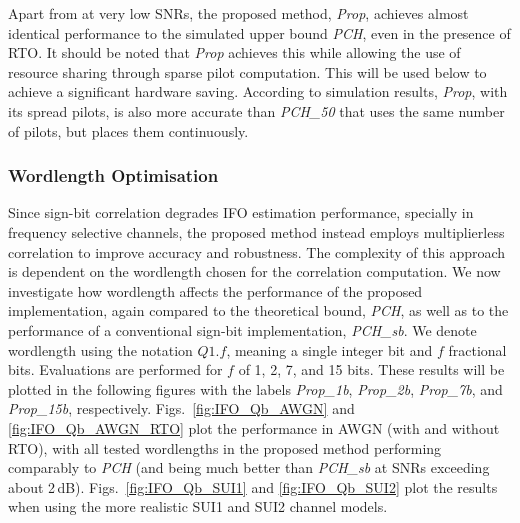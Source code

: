Apart from at very low SNRs, the proposed method, \emph{Prop}, achieves almost identical performance to the simulated upper bound \emph{PCH}, even in the presence of RTO.
It should be noted that \emph{Prop} achieves this while allowing the use of resource sharing through sparse pilot computation. This will be used below to achieve a significant hardware saving.
According to simulation results, \emph{Prop}, with its spread pilots, is also more accurate than \emph{PCH\_50} that uses the same number of pilots, but places them continuously.

\subsubsection{Wordlength Optimisation}
Since sign-bit correlation degrades IFO estimation performance, specially in frequency selective channels, the proposed method instead employs multiplierless correlation to improve accuracy and robustness.
The complexity of this approach is dependent on the wordlength chosen for the correlation computation.
We now investigate how wordlength affects the performance of the proposed implementation, again compared to the theoretical bound, \emph{PCH}, as well as to the performance of a conventional sign-bit implementation, \emph{PCH\_sb}.
We denote wordlength using the notation $Q1.f$, meaning a single integer bit and $f$ fractional bits.
Evaluations are performed for $f$ of 1, 2, 7, and 15 bits. These results will be plotted in the following figures with the labels \emph{Prop\_1b}, \emph{Prop\_2b}, \emph{Prop\_7b}, and \emph{Prop\_15b}, respectively.
Figs.~\ref{fig:IFO_Qb_AWGN} and \ref{fig:IFO_Qb_AWGN_RTO} plot the performance in AWGN (with and without RTO), with all tested wordlengths in the proposed method performing comparably to \emph{PCH} (and being much better than \emph{PCH\_sb} at SNRs exceeding about 2\,dB).
Figs.~\ref{fig:IFO_Qb_SUI1} and \ref{fig:IFO_Qb_SUI2} plot the results when using the more realistic SUI1 and SUI2 channel models.

